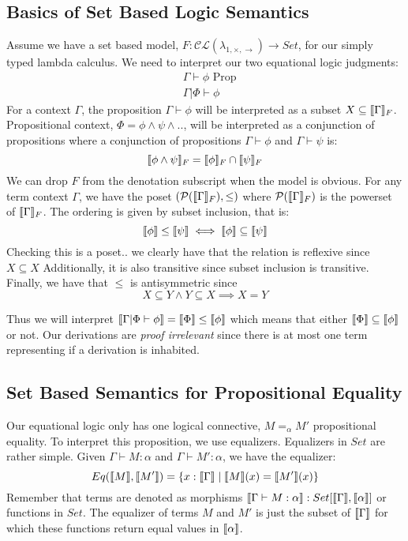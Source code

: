\documentclass{article}
\begin{document}
\subsection{Basics of Set Based Logic Semantics}
Assume we have a set based model, $F : \mathcal{CL}(\lambda_{1,\times,\rightarrow}) \rightarrow Set$, for our simply typed lambda calculus.
We need to interpret our two equational logic judgments:
\begin{align*}
    &\Gamma \vdash \phi \textrm{ Prop}\\
    &\Gamma | \Phi \vdash \phi
\end{align*}
For a context $\Gamma$, the proposition $\Gamma \vdash \phi$ will be interpreted as a subset $X \subseteq \llbracket \Gamma \rrbracket_F$. 
Propositional context, $\Phi = \phi \land \psi \land ..$, will be interpreted as a conjunction of propositions 
where a conjunction of propositions $\Gamma \vdash \phi$ and $\Gamma \vdash \psi$ is:
\[
    \llbracket \phi \land \psi \rrbracket_F = \llbracket \phi \rrbracket_F \cap \llbracket \psi \rrbracket_F
\]
We can drop $F$ from the denotation subscript when the model is obvious.
For any term context $\Gamma$, we have the poset $(\mathcal{P}(\llbracket \Gamma \rrbracket_F), \leq)$
where $\mathcal{P}(\llbracket \Gamma \rrbracket_F)$ is the powerset of $\llbracket \Gamma \rrbracket_F$.
The ordering is given by subset inclusion, that is:
\[
  \llbracket \phi \rrbracket \leq \llbracket \psi \rrbracket \iff \llbracket \phi \rrbracket \subseteq \llbracket \psi \rrbracket  
\]
Checking this is a poset.. we clearly have that the relation is reflexive since $X \subseteq X$
Additionally, it is also transitive since subset inclusion is transitive.
Finally, we have that $\leq$ is anti\-symmetric since 
\[
    X \subseteq Y \land Y \subseteq X \implies  X = Y 
\]

Thus we will interpret $\llbracket \Gamma | \Phi \vdash \phi \rrbracket = \llbracket \Phi \rrbracket \leq  \llbracket \phi \rrbracket$ 
which means that either $\llbracket \Phi \rrbracket \subseteq \llbracket \phi \rrbracket$ or not. 
Our derivations are \textit{proof irrelevant} since there is at most one term representing if a derivation is inhabited.

\subsection{Set Based Semantics for Propositional Equality}
Our equational logic only has one logical connective, $M =_{\alpha} M'$ propositional equality.
To interpret this proposition, we use equalizers. Equalizers in $Set$ are rather simple.
Given $\Gamma \vdash M : \alpha$ and $\Gamma \vdash M' : \alpha$, we have the equalizer:
\[
    Eq(\llbracket M \rrbracket,\llbracket M' \rrbracket) = \{ x : \llbracket \Gamma \rrbracket \;|\; \llbracket M \rrbracket(x) = \llbracket M' \rrbracket(x)\}
\]
Remember that terms are denoted as morphisms $\llbracket \Gamma \vdash M : \alpha \rrbracket : Set[\llbracket \Gamma \rrbracket,\llbracket \alpha \rrbracket]$ or functions in $Set$.
The equalizer of terms $M$ and $M'$ is just the subset of $\llbracket \Gamma \rrbracket$ for which these functions return equal values in $\llbracket \alpha \rrbracket$.
\end{document}
